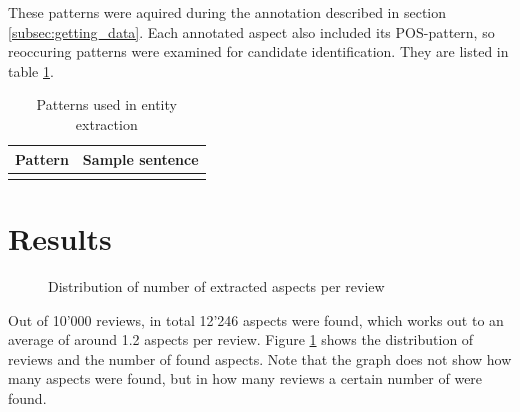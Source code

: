 \documentclass[a4paper,11pt]{kth-mag}
\begin{document}
These patterns were aquired during the annotation described in section \ref{subsec:getting_data}.
Each annotated aspect also included its POS-pattern, so reoccuring patterns were
examined for candidate identification. They are listed in table \ref{tab:used_pos}.

\newcommand{\ExtrPatOne}{\texttt{<NNS?><VB.?>+<JJ.?>+}}
\newcommand{\ExtrPatTwo}{\texttt{<NNS?><VB.?>+<RB.?><JJ.?>}}

\begin{table}[t]
  \centering
  \begin{tabular}{| l | l |}
    \hline
    \textbf{Pattern} & \textbf{Sample sentence}\\ \hline
    &\\

    \hline
  \end{tabular}
  \caption{Patterns used in entity extraction}
  \label{tab:used_pos}
\end{table}

\section{Results}

\begin{figure}[h]
  \centering
  \caption{Distribution of number of extracted aspects per review}
  \label{fig:extr_count}
\end{figure}



Out of 10'000 reviews, in total 12'246 aspects were found, which works out to an average of around 1.2 aspects per review. Figure \ref{fig:extr_count} shows the distribution of reviews and the number of found aspects. Note that the graph does not show how many aspects were found, but in how many reviews a certain number of were found.
\end{document}
